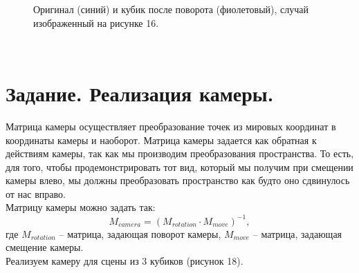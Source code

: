 \documentclass[a5paper, 10pt]{article}
\theoremstyle{definition}
\theoremstyle{plain}
\theoremstyle{remark}
\begin{document}
\begin{figure}[h!]
\caption{Оригинал (синий) и кубик после поворота (фиолетовый), случай изображенный на рисунке 16.}
\end{figure}




\newpage
\,
\newpage
\section{Задание. Реализация камеры.}
Матрица камеры осуществляет преобразование точек из мировых координат в координаты камеры и наоборот. Матрица камеры задается как обратная к действиям камеры, так как мы производим преобразования пространства. То есть, для того, чтобы продемонстрировать тот вид, который мы получим при смещении камеры влево, мы должны преобразовать пространство как будто оно сдвинулось от нас вправо. 
\\Матрицу камеры можно задать так:
\begin{equation}
M_{camera} = \left( M_{rotation} \cdot M_{move} \right)^{-1},
\end{equation}
где $M_{rotation}$ -- матрица, задающая поворот камеры, $M_{move}$ -- матрица, задающая смещение камеры.\\

Реализуем камеру для сцены из 3 кубиков (рисунок 18).
\end{document}
